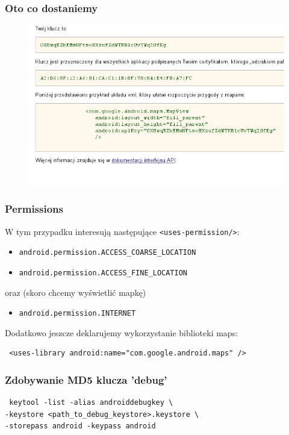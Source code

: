 \documentclass{beamer}
\begin{document}
\begin{frame}
\frametitle{Oto co dostaniemy}
\begin{figure}
 \centering
 \includegraphics{images/maps_get_key}
\end{figure}
 
\end{frame}


\begin{frame}[fragile]
 \frametitle{Permissions}

W tym przypadku interesują następujące \verb|<uses-permission/>|:

\begin{itemize}
 \item \verb|android.permission.ACCESS_COARSE_LOCATION|
 \item \verb|android.permission.ACCESS_FINE_LOCATION|
\end{itemize}

oraz (skoro chcemy wyświetlić mapkę)
\begin{itemize}
 \item \verb|android.permission.INTERNET|
\end{itemize}

\pause

Dodatkowo jeszcze deklarujemy wykorzystanie biblioteki maps:
\begin{verbatim}
 <uses-library android:name="com.google.android.maps" />
\end{verbatim}


\end{frame}



\begin{frame}[fragile]
 \frametitle{Zdobywanie MD5 klucza 'debug'}
\begin{lstlisting}
 keytool -list -alias androiddebugkey \
-keystore <path_to_debug_keystore>.keystore \
-storepass android -keypass android
\end{lstlisting}
\end{frame}
\end{document}
